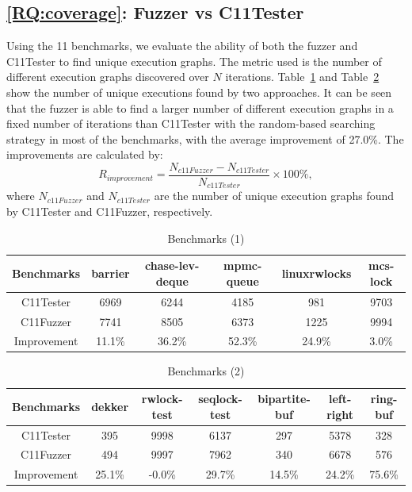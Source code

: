 \subsection{\ref*{RQ:coverage}: Fuzzer vs C11Tester}

Using the 11 benchmarks, we evaluate the ability of both the fuzzer and C11Tester to find unique execution graphs. The metric used is the number of different execution graphs discovered over $N$ iterations. Table~\ref{c11fuzzer-bench1} and Table~\ref{c11fuzzer-bench2} show the number of unique executions found by two approaches. It can be seen that the fuzzer is able to find a larger number of different execution graphs in a fixed number of iterations than C11Tester with the random-based searching strategy in most of the benchmarks, with the average improvement of 27.0\%. The improvements are calculated by:
\[
	R_{improvement} = \frac{N_{c11Fuzzer} - N_{c11Tester} }{N_{c11Tester} } \times 100 \% ,
\]
where $N_{c11Fuzzer}$ and $N_{c11Tester}$ are the number of unique execution graphs found by C11Tester and C11Fuzzer, respectively.

\begin{table}[h!]
	\begin{tabular}{ |c|ccccc| }
		\hline
		Benchmarks  & barrier & chase-lev-deque & mpmc-queue & linuxrwlocks & mcs-lock \\
		\hline
		C11Tester   & 6969    & 6244            & 4185       & 981          & 9703     \\
		C11Fuzzer   & 7741    & 8505            & 6373       & 1225         & 9994     \\
		\hline
		Improvement & 11.1\%  & 36.2\%          & 52.3\%     & 24.9\%       & 3.0\%    \\
		\hline
	\end{tabular}
	\caption{Benchmarks (1)}
	\label{c11fuzzer-bench1}

\end{table}

\begin{table}[h!]
	\begin{tabular}{ |c|cccccc| }
		\hline
		Benchmarks  & dekker & rwlock-test & seqlock-test & bipartite-buf & left-right & ring-buf \\
		\hline
		C11Tester   & 395    & 9998        & 6137         & 297           & 5378       & 328      \\
		C11Fuzzer   & 494    & 9997        & 7962         & 340           & 6678       & 576      \\
		\hline
		Improvement & 25.1\% & -0.0\%      & 29.7\%       & 14.5\%        & 24.2\%     & 75.6\%   \\
		\hline
	\end{tabular}
	\caption{Benchmarks (2)}
	\label{c11fuzzer-bench2}
\end{table}


